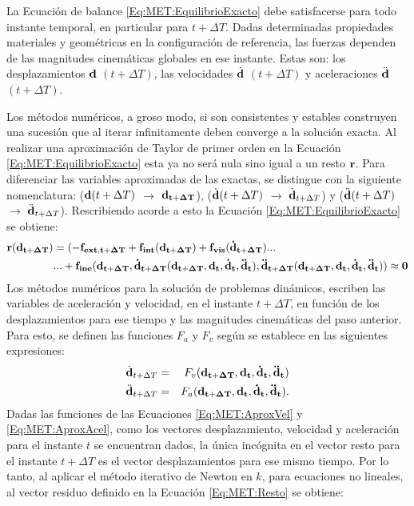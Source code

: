 La Ecuación de balance \eqref{Eq:MET:EquilibrioExacto} debe satisfacerse para todo instante temporal, en particular para $t+\Delta T$. Dadas determinadas propiedades materiales y geométricas en la configuración de referencia, las fuerzas dependen de las magnitudes cinemáticas globales en ese instante. Estas son: los desplazamientos $\bf{d}$ $(t+\Delta T)$, las velocidades $\dot{\bf{d}}$ $(t+\Delta T)$ y aceleraciones $\ddot{\bf{d}}$ $(t+\Delta T)$.

Los métodos numéricos, a groso modo, si son consistentes y estables construyen una sucesión que al iterar infinitamente deben converge a la solución exacta. Al realizar una aproximación de Taylor de primer orden en la Ecuación \eqref{Eq:MET:EquilibrioExacto} esta ya no será nula sino igual a un resto $\bf{r}$. Para diferenciar las variables aproximadas de las exactas, se distingue con la siguiente nomenclatura: ($\bf{d}\text{$(t+\Delta T)$}$ $\rightarrow$ $\bf{d}_{t+\Delta T}$), ($\dot{\bf{d}}\text{$(t+\Delta T)$}$ $\rightarrow$ $\dot{\bf{d}}_{t+\Delta T}$) y ($\ddot{\bf{d}}\text{$(t+\Delta T)$}$ $\rightarrow$ $\ddot{\bf{d}}_{t+\Delta T}$). Rescribiendo acorde a esto la Ecuación \eqref{Eq:MET:EquilibrioExacto} se obtiene:
\begin{equation}\label{Eq:MET:Resto}
	\begin{split}
		\bf{r}(\bf{d}_{t+\Delta T})&=(-\bf{f}_{ext,t+\Delta T}+\bf{f}_{int}(\bf{d}_{t+\Delta T})+\bf{f}_{vis}(\dot{\bf{d}}_{t+\Delta T})...\\	
		&...+\bf{f}_{ine}(\bf{d_{t+\Delta T}},\dot{\bf{d}}_{t+\Delta T}(d_{t+\Delta T},\bf{d_t},\bf{\dot{d}_t},\bf{\ddot{d}_t}),
		\ddot{\bf{d}}_{t+\Delta T}(d_{t+\Delta T},\bf{d_t},\bf{\dot{d}_t},\bf{\ddot{d}_t}))
		\approx 0
	\end{split}
\end{equation}
Los métodos numéricos para la solución de problemas dinámicos, escriben las variables de aceleración y velocidad, en el instante $t +\Delta T$, en función de los desplazamientos para ese tiempo y las magnitudes cinemáticas del paso anterior. Para esto, se definen las funciones $F_a$ y $F_v$ según se establece en las siguientes expresiones:
\begin{eqnarray}\label{Eq:MET:AproxVel}
	\dot{\bf{d}}_{t+\Delta T}&=&F_v(\bf{d_{t+\Delta T}},\bf{d_t},\bf{\dot{d}_t},\bf{\ddot{d}_t})\\
	\label{Eq:MET:AproxAcel}
	\ddot{\bf{d}}_{t+\Delta T}&=&F_a(\bf{d_{t+\Delta T}},\bf{d_t},\bf{\dot{d}_t},\bf{\ddot{d}_t}).
\end{eqnarray}
Dadas las funciones de las Ecuaciones \eqref{Eq:MET:AproxVel} y \eqref{Eq:MET:AproxAcel}, como los vectores desplazamiento, velocidad y aceleración para el instante $t$ se encuentran dados, la única incógnita en el vector resto para el instante $t+\Delta T$ es el vector desplazamientos para ese mismo tiempo. Por lo tanto, al aplicar el método iterativo de Newton en $k$, para ecuaciones no lineales, al vector residuo definido en la Ecuación \eqref{Eq:MET:Resto} se obtiene:

